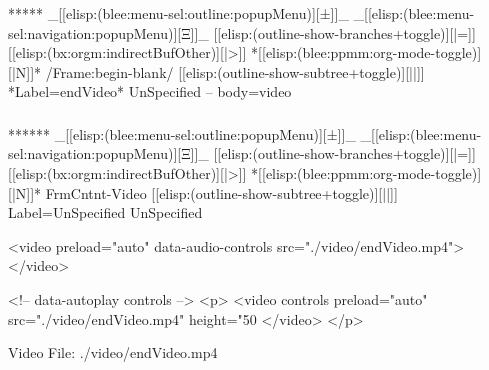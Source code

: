 \begin{whenOrg}
\begin{whenOrg}
*****  _[[elisp:(blee:menu-sel:outline:popupMenu)][±]]_ _[[elisp:(blee:menu-sel:navigation:popupMenu)][Ξ]]_ [[elisp:(outline-show-branches+toggle)][|=]] [[elisp:(bx:orgm:indirectBufOther)][|>]] *[[elisp:(blee:ppmm:org-mode-toggle)][|N]]*  /Frame:begin-blank/ [[elisp:(outline-show-subtree+toggle)][||]] *Label=endVideo* UnSpecified -- body=video
\end{whenOrg}

\begin{frame}[fragile,plain,label=endVideo]
    \frametitle{}

\begin{whenOrg}
******  _[[elisp:(blee:menu-sel:outline:popupMenu)][±]]_ _[[elisp:(blee:menu-sel:navigation:popupMenu)][Ξ]]_ [[elisp:(outline-show-branches+toggle)][|=]] [[elisp:(bx:orgm:indirectBufOther)][|>]] *[[elisp:(blee:ppmm:org-mode-toggle)][|N]]*  FrmCntnt-Video [[elisp:(outline-show-subtree+toggle)][||]] Label=UnSpecified UnSpecified
\end{whenOrg}
\begin{presentationMode}
\begin{htmlonly}
  \begin{rawhtml}
<video preload="auto" data-audio-controls src="./video/endVideo.mp4"></video>
  \end{rawhtml}
\end{htmlonly}
\end{presentationMode}

\begin{articleMode}
\begin{htmlonly}
  \begin{rawhtml}
      <!-- data-autoplay  controls -->
    <p>
    <video  controls   preload="auto"  src="./video/endVideo.mp4"  height="50%
    </video>
    </p>
  \end{rawhtml}
\end{htmlonly}
\end{articleMode}

\begin{presentationMode}
\begin{latexonly}
    \begin{center}
      Video File: ./video/endVideo.mp4
    \end{center}
\end{latexonly}
\end{presentationMode}


\end{frame}
\end{whenOrg}
